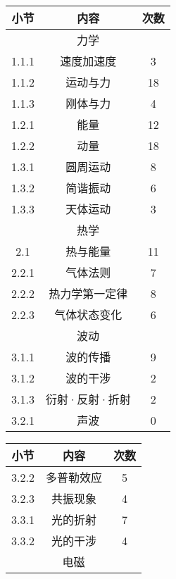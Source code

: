 \begin{center}
    \renewcommand\arraystretch{1.2}
    \begin{minipage}{0.48\textwidth}
        \centering
        \begin{tabular}{c|c|c}
            \hline
            小节&内容&次数\\\hline
            \multicolumn{3}{c}{力学}\\\hline
            1.1.1&速度加速度&3\\\hline
            1.1.2&运动与力&18\\\hline
            1.1.3&刚体与力&4\\\hline
            1.2.1&能量&12\\\hline
            1.2.2&动量&18\\\hline
            1.3.1&圆周运动&8\\\hline
            1.3.2&简谐振动&6\\\hline
            1.3.3&天体运动&3\\\hline
            \multicolumn{3}{c}{热学}\\\hline
            2.1&热与能量&11\\\hline
            2.2.1&气体法则&7\\\hline
            2.2.2&热力学第一定律&8\\\hline
            2.2.3&气体状态变化&6\\\hline
            \multicolumn{3}{c}{波动}\\\hline
            3.1.1&波的传播&9\\\hline
            3.1.2&波的干涉&2\\\hline
            3.1.3&衍射·反射·折射&2\\\hline
            3.2.1&声波&0\\\hline
        \end{tabular}
    \end{minipage}
    \begin{minipage}{0.48\textwidth}
        \centering
        \begin{tabular}{c|c|c}
            \hline
            小节&内容&次数\\\hline
            3.2.2&多普勒效应&5\\\hline
            3.2.3&共振现象&4\\\hline
            3.3.1&光的折射&7\\\hline
            3.3.2&光的干涉&4\\\hline
            \multicolumn{3}{c}{电磁}\\\hline

\end{tabular}
\end{minipage}
\end{center}
